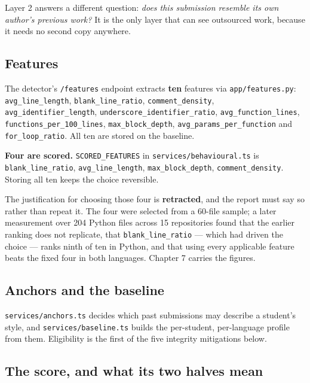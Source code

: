 Layer 2 answers a different question: \emph{does this submission
resemble its own author's previous work?} It is the only layer that can
see outsourced work, because it needs no second copy anywhere.

\hypertarget{features}{%
\subsection{Features}\label{features}}

The detector's \texttt{/features} endpoint extracts \textbf{ten}
features via \texttt{app/features.py}: \texttt{avg\_line\_length},
\texttt{blank\_line\_ratio}, \texttt{comment\_density},
\texttt{avg\_identifier\_length},
\texttt{underscore\_identifier\_ratio}, \texttt{avg\_function\_lines},
\texttt{functions\_per\_100\_lines}, \texttt{max\_block\_depth},
\texttt{avg\_params\_per\_function} and \texttt{for\_loop\_ratio}. All
ten are stored on the baseline.

\textbf{Four are scored.} \texttt{SCORED\_FEATURES} in
\texttt{services/behavioural.ts} is \texttt{blank\_line\_ratio},
\texttt{avg\_line\_length}, \texttt{max\_block\_depth},
\texttt{comment\_density}. Storing all ten keeps the choice reversible.

The justification for choosing those four is \textbf{retracted}, and the
report must say so rather than repeat it. The four were selected from a
60-file sample; a later measurement over 204 Python files across 15
repositories found that the earlier ranking does not replicate, that
\texttt{blank\_line\_ratio} --- which had driven the choice --- ranks
ninth of ten in Python, and that using every applicable feature beats
the fixed four in both languages. Chapter 7 carries the figures.

\hypertarget{anchors-and-the-baseline}{%
\subsection{Anchors and the baseline}\label{anchors-and-the-baseline}}

\texttt{services/anchors.ts} decides which past submissions may describe
a student's style, and \texttt{services/baseline.ts} builds the
per-student, per-language profile from them. Eligibility is the first of
the five integrity mitigations below.

\hypertarget{the-score-and-what-its-two-halves-mean}{%
\subsection{The score, and what its two halves
mean}\label{the-score-and-what-its-two-halves-mean}}

